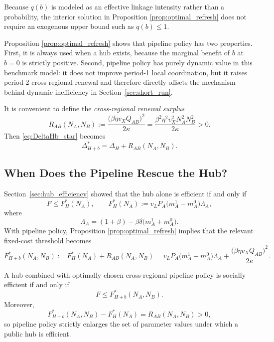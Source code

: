 Because $q(b)$ is modeled as an effective linkage intensity rather than a probability, the interior solution in Proposition \ref{prop:optimal_refresh} does not require an exogenous upper bound such as $q(b)\le 1$.

Proposition \ref{prop:optimal_refresh} shows that pipeline policy has two properties. First, it is always used when a hub exists, because the marginal benefit of $b$ at $b=0$ is strictly positive. Second, pipeline policy has purely dynamic value in this benchmark model: it does not improve period-1 local coordination, but it raises period-2 cross-regional renewal and therefore directly offsets the mechanism behind dynamic inefficiency in Section~\ref{sec:short_run}.

It is convenient to define the \emph{cross-regional renewal surplus}
\begin{equation}
R_{AB}(N_A,N_B)
:=
\frac{\bigl(\beta \eta v_X Q_{AB}\bigr)^2}{2\kappa}
=
\frac{\beta^2\eta^2 v_X^2 N_A^2 N_B^2}{2\kappa}
>0.
\label{eq:refresh_surplus}
\end{equation}
Then \eqref{eq:DeltaHb_star} becomes
\begin{equation}
\Delta_{H+b}^*=\Delta_H+R_{AB}(N_A,N_B).
\label{eq:DeltaHb_star_compact}
\end{equation}

\subsection{When Does the Pipeline Rescue the Hub?}

Section~\ref{sec:hub_efficiency} showed that the hub alone is efficient if and only if
\[
F\le F_H^*(N_A),
\qquad
F_H^*(N_A):=v_L P_A \bigl(m_A^1-m_A^0\bigr)\Lambda_A,
\]
where
\[
\Lambda_A=(1+\beta)-\beta\delta\bigl(m_A^1+m_A^0\bigr).
\]
With pipeline policy, Proposition \ref{prop:optimal_refresh} implies that the relevant fixed-cost threshold becomes
\begin{equation}
F_{H+b}^*(N_A,N_B)
:=
F_H^*(N_A)+R_{AB}(N_A,N_B)
=
v_L P_A \bigl(m_A^1-m_A^0\bigr)\Lambda_A
+
\frac{\bigl(\beta \eta v_X Q_{AB}\bigr)^2}{2\kappa}.
\label{eq:F_Hb_star}
\end{equation}

\begin{proposition}
\label{prop:hub_plus_refresh_efficiency}
A hub combined with optimally chosen cross-regional pipeline policy is socially efficient if and only if
\begin{equation}
F\le F_{H+b}^*(N_A,N_B).
\label{eq:hub_refresh_efficiency_condition}
\end{equation}
Moreover,
\begin{equation}
F_{H+b}^*(N_A,N_B)-F_H^*(N_A)=R_{AB}(N_A,N_B)>0,
\label{eq:threshold_expansion}
\end{equation}
so pipeline policy strictly enlarges the set of parameter values under which a public hub is efficient.
\end{proposition}

